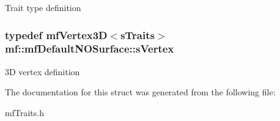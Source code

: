 \label{structmf_1_1mfDefaultNOSurface_a91330a9e2b3b15a4d53b8ca6b5039cf5}
Trait type definition \hypertarget{structmf_1_1mfDefaultNOSurface_a5dc1689ac66df10160905f65483dba3d}{
\subsubsection[{sVertex}]{\setlength{\rightskip}{0pt plus 5cm}typedef {\bf mfVertex3D}$<${\bf sTraits}$>$ {\bf mf::mfDefaultNOSurface::sVertex}}}
\label{structmf_1_1mfDefaultNOSurface_a5dc1689ac66df10160905f65483dba3d}
3D vertex definition 

The documentation for this struct was generated from the following file:\begin{DoxyCompactItemize}
\item 
mfTraits.h\end{DoxyCompactItemize}
